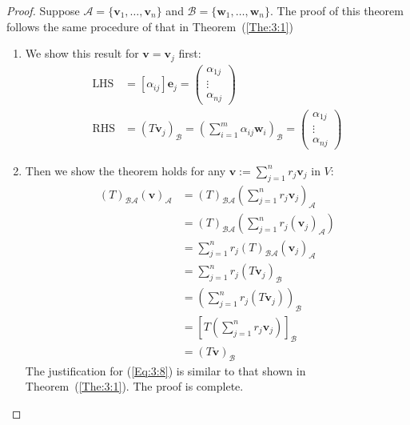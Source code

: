\begin{proof}
Suppose $\mathcal{A}=\{\bm v_1,\dots,\bm v_n\}$ and $\mathcal{B}=\{\bm w_1,\dots,\bm w_n\}$.  The proof of this theorem follows the same procedure of that in Theorem~(\ref{The:3:1})
\begin{enumerate}
\item
We show this result for $\bm v=\bm v_j$ first:
\begin{align*}
\text{LHS}&=[\alpha_{ij}]\bm e_j=
\begin{pmatrix}
\alpha_{1j}\\\vdots\\\alpha_{nj}
\end{pmatrix}
\\
\text{RHS}&=(T\bm v_j)_{\mathcal{B}}
=
\left(
\sum_{i=1}^m\alpha_{ij}\bm w_i
\right)_{\mathcal{B}}
=
\begin{pmatrix}
\alpha_{1j}\\\vdots\\\alpha_{nj}
\end{pmatrix}
\end{align*}
\item
Then we show the theorem holds for any $\bm v:=\sum_{j=1}^nr_j\bm v_j$ in $V$:
\begin{subequations}
\begin{align}\label{Eq:3:8}
(T)_{\mathcal{B}\mathcal{A}}(\bm v)_{\mathcal{A}}
&=
(T)_{\mathcal{B}\mathcal{A}}
\left(
\sum_{j=1}^nr_j\bm v_j
\right)_{\mathcal{A}}\\
&=
(T)_{\mathcal{B}\mathcal{A}}
\left(
\sum_{j=1}^nr_j(\bm v_j)_{\mathcal{A}}
\right)\\
&=
\sum_{j=1}^nr_j(T)_{\mathcal{B}\mathcal{A}}(\bm v_j)_{\mathcal{A}}\\
&=
\sum_{j=1}^nr_j(T\bm v_j)_{\mathcal{B}}\\
&=
\left(
\sum_{j=1}^nr_j(T\bm v_j)
\right)_{\mathcal{B}}\\
&=
\left[
T
(
\sum_{j=1}^nr_j\bm v_j
)
\right]_{\mathcal{B}}\\
&=(T\bm v)_{\mathcal{B}}
\end{align}
\end{subequations}
The justification for (\ref{Eq:3:8}) is similar to that shown in Theorem~(\ref{The:3:1}). The proof is complete.
\end{enumerate}





\end{proof}

